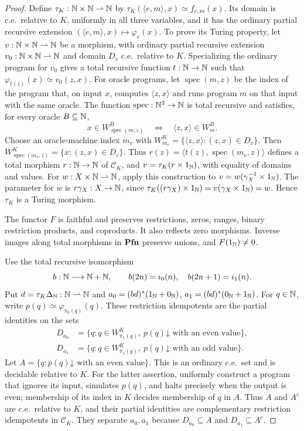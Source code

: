 \begin{proof}
Define $\tau_K:\mathbb N\times\mathbb N\rightharpoonup\mathbb N$ by
$\tau_K(\langle e,m\rangle,x)\simeq f_{e,m}(x)$.
Its domain is c.e.\ relative to $K$, uniformly in all three
variables, and it has the ordinary partial recursive extension
$(\langle e,m\rangle,x)\mapsto\varphi_e(x)$.
To prove its Turing property, let
$v:\mathbb N\times\mathbb N\rightharpoonup\mathbb N$ be a morphism, with ordinary
partial recursive extension $v_0:\mathbb N\times\mathbb N\rightharpoonup\mathbb N$ and
domain $D_v$ c.e.\ relative to $K$. Specializing the ordinary program
for $v_0$ gives a total recursive function $t:\mathbb N\to\mathbb N$ such that
$\varphi_{t(z)}(x)\simeq v_0(z,x)$.
For oracle programs, let $\operatorname{spec}(m,z)$ be the index of the program that,
on input $x$, computes $\langle z,x\rangle$ and runs program $m$
on that input with the same oracle. The function $\operatorname{spec}:\mathbb N^2\to\mathbb N$ is
total recursive and satisfies, for every oracle $B\subseteq\mathbb N$,
\[
 x\in W_{\operatorname{spec}(m,z)}^B\quad\Longleftrightarrow\quad
 \langle z,x\rangle\in W_m^B.
\]
Choose an oracle-machine index $m_v$ with
$W_{m_v}^K=\{\langle z,x\rangle:(z,x)\in D_v\}$.
Then $W_{\operatorname{spec}(m_v,z)}^K=\{x:(z,x)\in D_v\}$.
Thus $r(z)=\langle t(z),\operatorname{spec}(m_v,z)\rangle$ defines a total
morphism $r:\mathbb N\to\mathbb N$ of $\mathcal C_K$, and
$v=\tau_K(r\times1_{\mathbb N})$, with equality of domains and values.
For $w:X\times\mathbb N\rightharpoonup\mathbb N$, apply this construction to
$v=w(\gamma_X^{-1}\times1_{\mathbb N})$. The parameter for $w$ is
$r\gamma_X:X\to\mathbb N$, since
$\tau_K((r\gamma_X)\times1_{\mathbb N})=v(\gamma_X\times1_{\mathbb N})=w$.
Hence $\tau_K$ is a Turing morphism.

The functor $F$ is faithful and preserves restrictions, zeros,
ranges, binary restriction products, and coproducts. It also reflects
zero morphisms. Inverse images along total morphisms in $\mathbf{Pfn}$ preserve unions,
and $F(1_{\mathbb N})\ne0$.

Use the total recursive isomorphism
\[
 b:\mathbb N\longrightarrow\mathbb N+\mathbb N,\qquad
 b(2n)=i_0(n),\quad b(2n+1)=i_1(n).
\]
Put $d=\tau_K\Delta_{\mathbb N}:\mathbb N\rightharpoonup\mathbb N$ and
$a_0=(bd)^*(1_{\mathbb N}+0_{\mathbb N})$,
$a_1=(bd)^*(0_{\mathbb N}+1_{\mathbb N})$.
For $q\in\mathbb N$, write
$p(q)\simeq\varphi_{\pi_0(q)}(q)$. These restriction idempotents
are the partial identities on the sets
\[
 \begin{aligned}
 D_{a_0}&=\{q:q\in W_{\pi_1(q)}^K,
                    \ p(q)\mathord\downarrow\text{ with an even value}\},\\
 D_{a_1}&=\{q:q\in W_{\pi_1(q)}^K,
                    \ p(q)\mathord\downarrow\text{ with an odd value}\}.
 \end{aligned}
\]
Let $A=\{q:p(q)\mathord\downarrow\text{ with an even value}\}$.
This is an ordinary c.e.\ set and is decidable relative to $K$.
For the latter assertion, uniformly construct a program that ignores
its input, simulates $p(q)$, and halts precisely when the output is
even; membership of its index in $K$ decides membership of $q$ in $A$.
Thus $A$ and $A^c$ are c.e.\ relative to $K$, and their partial
identities are complementary restriction idempotents in $\mathcal C_K$.
They separate $a_0,a_1$ because
$D_{a_0}\subseteq A$ and $D_{a_1}\subseteq A^c$.


\end{proof}
